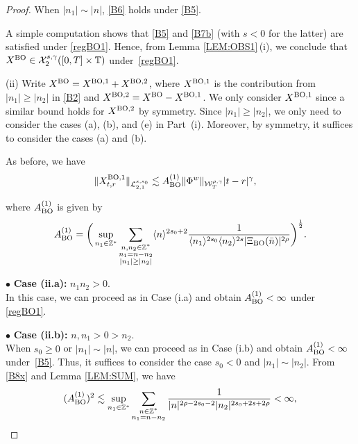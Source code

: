 \documentclass[letterpaper, 11pt,  reqno]{amsart}
\newcommand{\1}{\hspace{0.5mm}\text{I}\hspace{0.5mm}}
\newcommand{\noi}{\noindent}
\newcommand{\Z}{\mathbb{Z}}
\newcommand{\T}{\mathbb{T}}
\newcommand{\bul}{\bullet}
\newcommand{\g}{\gamma}
\newcommand{\les}{\lesssim}
\newcommand{\jb}[1]
{\langle #1 \rangle}
\newcommand{\cL}{\mathcal{L}}
\newcommand{\cX}{\mathcal{X}}
\newcommand{\W}{\mathcal{W}}
\newcommand{\BO}{\text{\rm BO} }
\numberwithin{equation}{section}
\numberwithin{theorem}{section}
\begin{document}
\begin{proof}
\noi
When $ |n_1| \sim |n|$, 
\eqref{B6} holds under 
 \eqref{B5}.



A simple computation shows that \eqref{B5}
and \eqref{B7b} (with $s < 0$ for the latter)
are satisfied under \eqref{regBO1}.
Hence,
from  Lemma \ref{LEM:OBS1}\,(i),  
we conclude that 
 $X^\BO\in  \cX^{s, \g}_2([0, T]\times \T)$ under~\eqref{regBO1}.



\medskip

\noi
(ii) 
 Write $X^\BO = X^{\BO, 1} + X^{\BO, 2}$, 
where $X^{\BO, 1}$ is the contribution from $|n_1| \ge |n_2|$ in \eqref{B2}
and $X^{\BO, 2} = X^\BO - X^{\BO, 1}$.
We only consider $X^{\BO, 1}$ since a similar bound holds for $X^{\BO, 2}$ by symmetry.
Since $|n_1| \ge |n_2|$, 
we only need to consider the cases (a), (b), and (e) in Part~(i).
Moreover, by symmetry, 
it suffices to consider the cases (a) and (b).



As before, we have 
\begin{align}
\|X^{\BO, 1}_{t,r} \|_{\cL_{2, 1}^{s, s_0}}
&\les
A^{(1)}_\BO \| \Phi^w \|_{\W_T^{\rho,\g}} 
  |t-r|^{\g},  
\label{B8}
\end{align}

\noi
where $A^{(1)}_\BO$ is given by
\begin{align}
A^{(1)}_\BO = \bigg(\sup_{n_1 \in \Z^*}
\sum_{\substack{n, n_2 \in \Z^*\\n_1 = n - n_2\\|n_1|\ge |n_2|}} 
 \jb{n}^{2{s_0} + 2}
 \frac{1}{\jb{n_1}^{2{s_0}} \jb{n_2}^{2s} |  \Xi_\BO (\bar n)|^{2\rho}}\bigg)^\frac 12.
\label{B8x}
\end{align}


\medskip

\noi
$\bul$ {\bf Case (ii.a):} $n_1 n_2 >0$.\\
\indent
In this case, we can proceed as in Case (i.a) 
and obtain 
$A^{(1)}_\BO < \infty$ under  \eqref{regBO1}.


\medskip

\noi
$\bul$ {\bf Case (ii.b):} $n, n_1>0>n_2$.\\
\indent
When $s_0 \ge 0$ or $|n_1| \sim |n|$, 
we  can proceed as in Case (i.b) 
and obtain 
$A^{(1)}_\BO < \infty$ under~\eqref{B5}.
Thus, it suffices to consider the case 
$s_0 < 0$ and $ |n_1| \sim |n_2|$.
From \eqref{B8x} and Lemma \ref{LEM:SUM}, we have 
\begin{align*}
(A_\BO^{(1)})^2\les  
\sup_{n_1\in \Z^*}
\sum_{\substack{n\in \Z^*\\ n_1 = n- n_2}}    
 \frac{ 1 }{  |n|^{ 2\rho -2s_0 - 2}  | n_2|^{2s_0 + 2s +2\rho} }
< \infty, 
\end{align*}


\end{proof}
\end{document}
